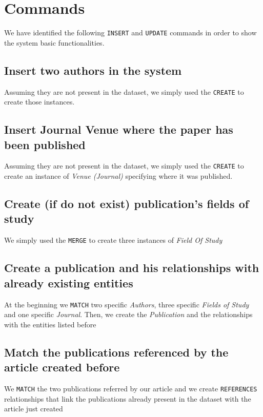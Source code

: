 \documentclass{Configuration_Files/PoliMi3i_thesis}
\begin{document}
\section{Commands}
We have identified the following \verb |INSERT| and \verb |UPDATE| commands in order to show the system basic functionalities.

\subsection{Insert two authors in the system}
Assuming they are not present in the dataset, we simply used the \verb |CREATE| to create those instances.


\subsection{Insert Journal Venue where the paper has been published}
Assuming they are not present in the dataset, we simply used the \verb |CREATE| to create an instance of \emph{Venue (Journal)}
specifying where it was published.


\subsection{Create (if do not exist) publication's fields of study}
We simply used the \verb |MERGE| to create three instances of \emph{Field Of Study}


\subsection{Create a publication and his relationships with already existing entities}
At the beginning we \verb |MATCH| two specific \emph{Authors}, three specific \emph{Fields of Study} and one specific
\emph{Journal}. Then, we create the \emph{Publication} and the relationships with the entities listed before


\subsection{Match the publications referenced by the article created before}
We \verb |MATCH| the two publications referred by our article and we create \verb |REFERENCES| relationships that link
the publications already present in the dataset with the article just created

\end{document}
